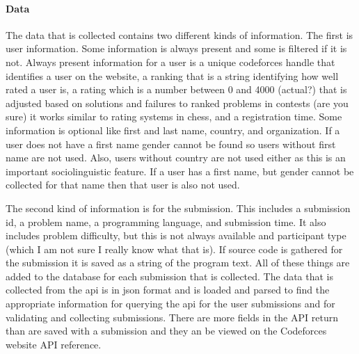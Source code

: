\documentclass{article}
\begin{document}
\paragraph{Data}
The data that is collected contains two different kinds of information. The first is user information. Some information is always present and some is filtered if it is not. Always present information for a user is a unique codeforces handle that identifies a user on the website, a ranking that is a string identifying how well rated a user is, a rating which is a number between 0 and 4000 (actual?) that is adjusted based on solutions and failures to ranked problems in contests (are you sure) it works similar to rating systems in chess, and a registration time. Some information is optional like first and last name, country, and organization. If a user does not have a first name gender cannot be found so users without first name are not used. Also, users without country are not used either as this is an important sociolinguistic feature. If a user has a first name, but gender cannot be collected for that name then that user is also not used.

The second kind of information is for the submission. This includes a submission id, a problem name, a programming language, and submission time. It also includes problem difficulty, but this is not always available and participant type (which I am not sure I really know what that is). If source code is gathered for the submission it is saved as a string of the program text. All of these things are added to the database for each submission that is collected. The data that is collected from the api is in json format and is loaded and parsed to find the appropriate information for querying the api for the user submissions and for validating and collecting submissions. There are more fields in the API return than are saved with a submission and they an be viewed on the Codeforces website API reference.
\end{document}
